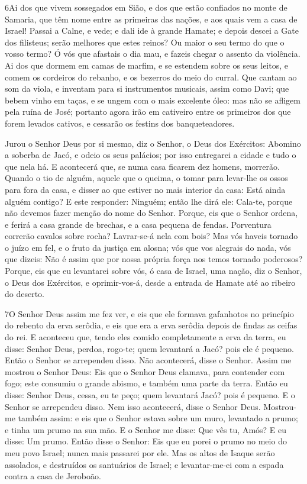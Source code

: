 \medskip

\lettrine{6} Ai dos que vivem sossegados em Sião, e dos que
estão confiados no monte de Samaria, que têm nome entre as primeiras
das nações, e aos quais vem a casa de Israel! Passai a Calne, e
vede; e dali ide à grande Hamate; e depois descei a Gate dos
filisteus; serão melhores que estes reinos? Ou maior o seu termo do
que o vosso termo? Ó vós que afastais o dia mau, e fazeis chegar
o assento da violência. Ai dos que dormem em camas de marfim, e
se estendem sobre os seus leitos, e comem os cordeiros do rebanho, e
os bezerros do meio do curral. Que cantam ao som da viola, e
inventam para si instrumentos musicais, assim como Davi; que
bebem vinho em taças, e se ungem com o mais excelente óleo: mas não
se afligem pela ruína de José; portanto agora irão em cativeiro
entre os primeiros dos que forem levados cativos, e cessarão os
festins dos banqueteadores.

Jurou o Senhor Deus por si mesmo, diz o Senhor, o Deus dos
Exércitos: Abomino a soberba de Jacó, e odeio os seus palácios; por
isso entregarei a cidade e tudo o que nela há. E acontecerá que,
se numa casa ficarem dez homens, morrerão. Quando o tio de
alguém, aquele que o queima, o tomar para levar-lhe os ossos para
fora da casa, e disser ao que estiver no mais interior da casa: Está
ainda alguém contigo? E este responder: Ninguém; então lhe dirá ele:
Cala-te, porque não devemos fazer menção do nome do Senhor.
Porque, eis que o Senhor ordena, e ferirá a casa grande de
brechas, e a casa pequena de fendas. Porventura correrão
cavalos sobre rocha? Lavrar-se-á nela com bois? Mas vós haveis
tornado o juízo em fel, e o fruto da justiça em alosna; vós
que vos alegrais do nada, vós que dizeis: Não é assim que por nossa
própria força nos temos tornado poderosos? Porque, eis que eu
levantarei sobre vós, ó casa de Israel, uma nação, diz o Senhor, o
Deus dos Exércitos, e oprimir-vos-á, desde a entrada de Hamate até
ao ribeiro do deserto.

\medskip

\lettrine{7} O Senhor Deus assim me fez ver, e eis que ele
formava gafanhotos no princípio do rebento da erva serôdia, e eis
que era a erva serôdia depois de findas as ceifas do rei. E
aconteceu que, tendo eles comido completamente a erva da terra, eu
disse: Senhor Deus, perdoa, rogo-te; quem levantará a Jacó? pois ele
é pequeno. Então o Senhor se arrependeu disso. Não acontecerá,
disse o Senhor. Assim me mostrou o Senhor Deus: Eis que o Senhor
Deus clamava, para contender com fogo; este consumiu o grande
abismo, e também uma parte da terra. Então eu disse: Senhor
Deus, cessa, eu te peço; quem levantará Jacó? pois é pequeno. E
o Senhor se arrependeu disso. Nem isso acontecerá, disse o Senhor
Deus. Mostrou-me também assim: e eis que o Senhor estava sobre
um muro, levantado a prumo; e tinha um prumo na sua mão. E o
Senhor me disse: Que vês tu, Amós? E eu disse: Um prumo. Então disse
o Senhor: Eis que eu porei o prumo no meio do meu povo Israel; nunca
mais passarei por ele. Mas os altos de Isaque serão assolados, e
destruídos os santuários de Israel; e levantar-me-ei com a espada
contra a casa de Jeroboão.

